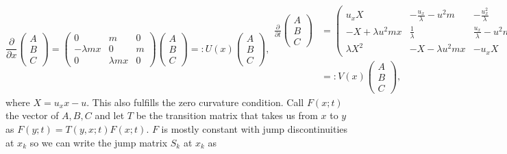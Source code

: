 \documentclass[english,master]{liumaiex}
\theoremstyle{plain}
\theoremstyle{definition}
\begin{document}
\begin{subequations}
  \begin{equation}
    \frac{\partial}{\partial x}
    \begin{pmatrix} A \\ B \\ C \end{pmatrix} =
    \begin{pmatrix}
      0 & m & 0 \\
      -\lambda m x & 0 & m \\
      0 & \lambda m x & 0
    \end{pmatrix}
    \begin{pmatrix} A \\ B \\ C \end{pmatrix}
	=: U(x) \begin{pmatrix} A \\ B \\ C \end{pmatrix}
    ,
  \end{equation}
  \begin{align}
    \frac{\partial}{\partial t}
    \begin{pmatrix} A \\ B \\ C \end{pmatrix} &=
    \begin{pmatrix}
      u_x X & -\frac{u_x}{\lambda} -u^2 m & -\frac{u_x^2}{\lambda} \\
      -X + \lambda u^2 m x & \frac{1}{\lambda} & \frac{u_x}{\lambda} - u^2 m \\
      \lambda X^2 & -X - \lambda u^2 m x & -u_x X
    \end{pmatrix}
    \begin{pmatrix} A \\ B \\ C \end{pmatrix} \\
	&=: V(x) \begin{pmatrix} A \\ B \\ C \end{pmatrix}
    ,
  \end{align}
\end{subequations}
where $X = u_x x - u$. This also fulfills the zero curvature condition. Call $F(x;t)$ the vector of $A, B, C$ and let $T$ be the transition matrix that takes us from $x$ to $y$ as $F(y;t) = T(y,x;t)F(x;t)$. $F$ is mostly constant with jump discontinuities at $x_k$ so we can write the jump matrix $S_k$ at $x_k$ as
\end{document}
